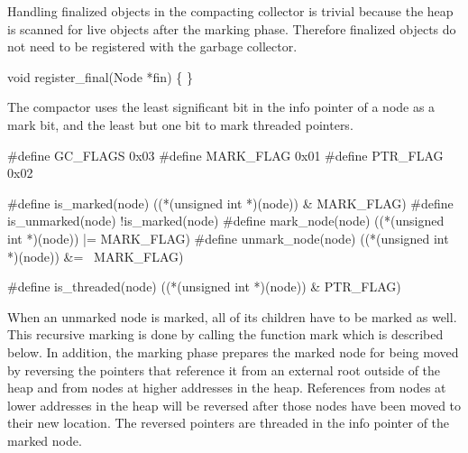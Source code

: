 \nwendcode{}\nwdocspar
Handling finalized objects in the compacting collector is trivial
because the heap is scanned for live objects after the marking phase.
Therefore finalized objects do not need to be registered with the
garbage collector.

\nwenddocs{}\plusendmoddef\nwstartdeflinemarkup{}\nwenddeflinemarkup
void
register_final(Node *fin)
\{
\}

\nwendcode{}\nwdocspar
The compactor uses the least significant bit in the info pointer of a
node as a mark bit, and the least but one bit to mark threaded
pointers.

\nwenddocs{}\endmoddef\nwstartdeflinemarkup{}\nwenddeflinemarkup
#define GC_FLAGS                0x03
#define MARK_FLAG               0x01
#define PTR_FLAG                0x02

#define is_marked(node)         ((*(unsigned int *)(node)) & MARK_FLAG)
#define is_unmarked(node)       !is_marked(node)
#define mark_node(node)         ((*(unsigned int *)(node)) |= MARK_FLAG)
#define unmark_node(node)       ((*(unsigned int *)(node)) &= ~MARK_FLAG)

#define is_threaded(node)       ((*(unsigned int *)(node)) & PTR_FLAG)

\nwendcode{}\nwdocspar
When an unmarked node is marked, all of its children have to be marked
as well. This recursive marking is done by calling the function
{\Tt{}mark\nwendquote} which is described below. In addition, the marking phase
prepares the marked node for being moved by reversing the pointers
that reference it from an external root outside of the heap and from
nodes at higher addresses in the heap. References from nodes at lower
addresses in the heap will be reversed after those nodes have been
moved to their new location. The reversed pointers are threaded in the
info pointer of the marked node.


